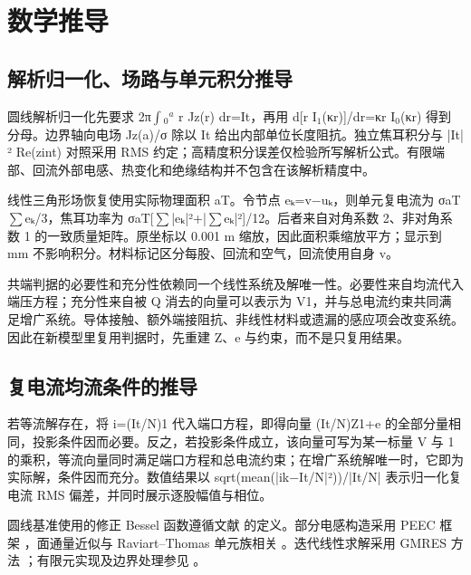 \appendix
\section{数学推导}
\label{chapter:A}

\hypertarget{A.report_derivation.heading}{}
\subsection{解析归一化、场路与单元积分推导}

\hypertarget{A.report_derivation.p1}{}
圆线解析归一化先要求 2π\(\int\)\(_0\)\(^a\) r Jz(r) dr=It，再用 d[r I\(_1\)(κr)]/dr=κr I\(_0\)(κr) 得到分母。边界轴向电场 Jz(a)/σ 除以 It 给出内部单位长度阻抗。独立焦耳积分与 |It|² Re(zint) 对照采用 RMS 约定；高精度积分误差仅检验所写解析公式。有限端部、回流外部电感、热变化和绝缘结构并不包含在该解析精度中。

\hypertarget{A.report_derivation.p2}{}
线性三角形场恢复使用实际物理面积 aT。令节点 eₖ=v−uₖ，则单元复电流为 σaT\(\sum\)eₖ/3，焦耳功率为 σaT[\(\sum\)|eₖ|²+|\(\sum\)eₖ|²]/12。后者来自对角系数 2、非对角系数 1 的一致质量矩阵。原坐标以 0.001 m 缩放，因此面积乘缩放平方；显示到 mm 不影响积分。材料标记区分每股、回流和空气，回流使用自身 v。

\hypertarget{A.report_derivation.p3}{}
共端判据的必要性和充分性依赖同一个线性系统及解唯一性。必要性来自均流代入端压方程；充分性来自被 Q 消去的向量可以表示为 V1，并与总电流约束共同满足增广系统。导体接触、额外端接阻抗、非线性材料或遗漏的感应项会改变系统。因此在新模型里复用判据时，先重建 Z、e 与约束，而不是只复用结果。

\hypertarget{A.sharing_derivation.heading}{}
\subsection{复电流均流条件的推导}

\hypertarget{A.sharing_derivation.p1}{}
若等流解存在，将 i=(It/N)1 代入端口方程，即得向量 (It/N)Z1+e 的全部分量相同，投影条件因而必要。反之，若投影条件成立，该向量可写为某一标量 V 与 1 的乘积，等流向量同时满足端口方程和总电流约束；在增广系统解唯一时，它即为实际解，条件因而充分。数值结果以 sqrt(mean(|ik−It/N|²))/|It/N| 表示归一化复电流 RMS 偏差，并同时展示逐股幅值与相位。

\hypertarget{A.method.sources}{}
圆线基准使用的修正 Bessel 函数遵循文献 \cite{BESSEL} 的定义。部分电感构造采用 PEEC 框架 \cite{RUEHLI1974}，面通量近似与 Raviart–Thomas 单元族相关 \cite{RT1977}。迭代线性求解采用 GMRES 方法 \cite{GMRES1986}；有限元实现及边界处理参见 \cite{FEMDOC}。
